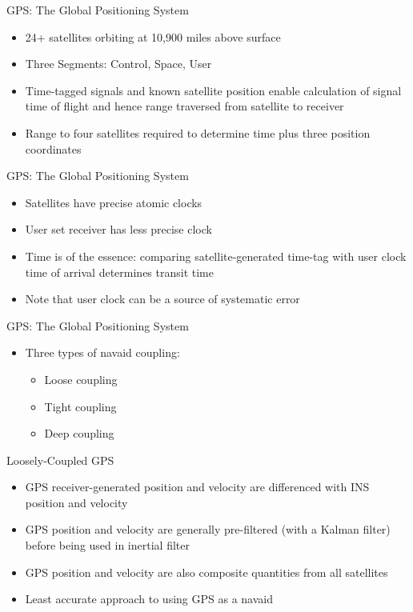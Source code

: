 \begin{frame}
GPS: The Global Positioning System
 \begin{itemize}
 \item 24+ satellites orbiting at 10,900 miles above surface
 \item Three Segments: Control, Space, User
 \item Time-tagged signals and known satellite position enable calculation of signal time of flight and hence range traversed from satellite to receiver
 \item Range to four satellites required to determine time plus three position coordinates
\end{itemize}
\end{frame}

\begin{frame}
GPS: The Global Positioning System
\begin{itemize}
  \item Satellites have precise atomic clocks
  \item User set receiver has less precise clock
  \item Time is of the essence:  comparing satellite-generated time-tag with user clock time of arrival determines transit time
  \item Note that user clock can be a source of systematic error
\end{itemize} 
\end{frame}

\begin{frame}
GPS: The Global Positioning System
\begin{itemize}
  \item Three types of navaid coupling:
  \begin{itemize}
	\item Loose coupling
    \item Tight coupling
    \item Deep coupling
  \end{itemize} 
\end{itemize} 
\end{frame}

\begin{frame}
Loosely-Coupled GPS
\begin{itemize}
  \item GPS receiver-generated position and velocity are differenced with INS position and velocity
  \item GPS position and velocity are generally pre-filtered (with a Kalman filter) before being used in inertial filter
  \item GPS position and velocity are also composite quantities from all satellites
  \item Least accurate approach to using GPS as a navaid
\end{itemize} 
\end{frame}


